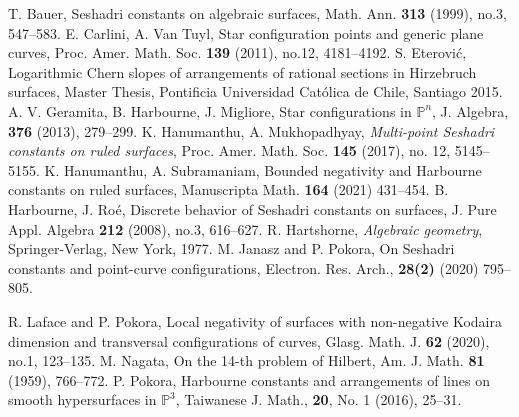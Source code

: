 \documentclass[12pt,reqno]{amsart}
\theoremstyle{plain}
\numberwithin{equation}{section}
\theoremstyle{definition}
\begin{document}
	
	
	\begin{thebibliography}{100}
	 T. Bauer, Seshadri constants on algebraic surfaces, Math. Ann. \textbf{313} (1999), no.3, 547--583.
	 E. Carlini, A. Van Tuyl, Star configuration points and generic plane curves, Proc. Amer. Math. Soc. \textbf{139} (2011), no.12, 4181--4192.
	 S. Eterovi\'c, Logarithmic Chern slopes of arrangements of rational sections in Hirzebruch surfaces,
		Master Thesis, Pontificia Universidad Cat\'olica de Chile, Santiago 2015.
		 A. V. Geramita, B. Harbourne, J. Migliore, Star configurations in $\mathbb{P}^n$, J. Algebra, \textbf{376} (2013), 279--299.
		 K. Hanumanthu, A. Mukhopadhyay, {\it Multi-point Seshadri constants on ruled surfaces}, Proc. Amer. Math. Soc. \textbf{145} (2017), no. 12, 5145--5155.
		 K. Hanumanthu, A. Subramaniam, Bounded negativity and Harbourne constants on ruled surfaces, Manuscripta Math. \textbf{164} (2021) 431--454. 
		 B. Harbourne, J. Ro\'e,
Discrete behavior of Seshadri constants on surfaces, J. Pure Appl. Algebra \textbf{212} (2008), no.3, 616--627.
		 R. Hartshorne, {\it Algebraic geometry},
		Springer-Verlag, New York, 1977.
		M. Janasz and P. Pokora, On Seshadri constants and point-curve configurations, Electron. Res. Arch., \textbf{28(2)} (2020)  795--805.

		
			 R. Laface and P. Pokora, 
		Local negativity of surfaces with non-negative Kodaira dimension and transversal configurations of curves, 
Glasg. Math. J. \textbf{62} (2020), no.1, 123--135.	
		 M. Nagata, On the 14-th problem of Hilbert, Am. J. Math. \textbf{81} (1959), 766--772.
	P. Pokora, Harbourne constants and arrangements of lines on smooth hypersurfaces in
$\mathbb{P}^3$,  Taiwanese J. Math., \textbf{20}, No. 1 (2016), 25--31.  
		

\end{thebibliography}
\end{document}
